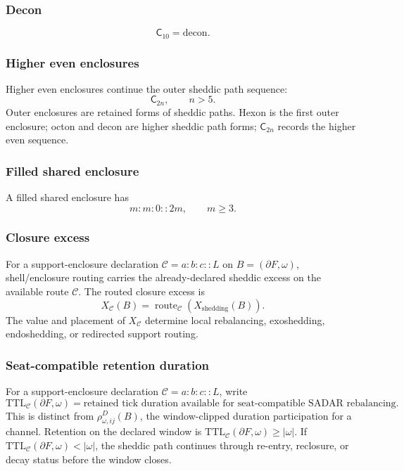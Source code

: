 \subsubsection{Decon}\label{subsec:decon}
\[
\mathsf C_{10}=\mathrm{decon}.
\]

\subsubsection{Higher even enclosures}\label{subsec:higher-even-enclosures}
Higher even enclosures continue the outer sheddic path sequence:
\[
\mathsf C_{2n},
\qquad n>5.
\]
Outer enclosures are retained forms of sheddic paths. Hexon is the first outer enclosure; octon and decon are higher sheddic path forms; \(\mathsf C_{2n}\) records the higher even sequence.

\subsubsection{Filled shared enclosure}\label{subsec:filled-shared-enclosures}
A filled shared enclosure has
\[
m:m:0::2m,
\qquad m\ge3.
\]
\subsubsection{Closure excess}\label{subsec:support-enclosure-sadar-closure}
For a support-enclosure declaration \(\mathcal C=a:b:c::L\) on \(B=(\partial F,\omega)\), shell/enclosure routing carries the already-declared sheddic excess on the available route \(\mathcal C\). The routed closure excess is
\begin{equation}
X_{\mathcal C}(B)
=
\operatorname{route}_{\mathcal C}\!\left(X_{\mathrm{shedding}}(B)\right).
\label{eq:support-enclosure-excess}
\end{equation}
The value and placement of \(X_{\mathcal C}\) determine local rebalancing, exoshedding, endoshedding, or redirected support routing.

\subsubsection{Seat-compatible retention duration}\label{subsec:support-enclosure-retention-condition}
For a support-enclosure declaration \(\mathcal C=a:b:c::L\), write
\begin{equation}
\mathrm{TTL}_{\mathcal C}(\partial F,\omega)
=
\text{retained tick duration available for seat-compatible SADAR rebalancing}.
\label{eq:support-enclosure-retention}
\end{equation}
This is distinct from \(\rho^D_{\omega,ij}(B)\), the window-clipped duration participation for a channel.
Retention on the declared window is \(\mathrm{TTL}_{\mathcal C}(\partial F,\omega)\ge |\omega|\). If \(\mathrm{TTL}_{\mathcal C}(\partial F,\omega)<|\omega|\), the sheddic path continues through re-entry, reclosure, or decay status before the window closes.

